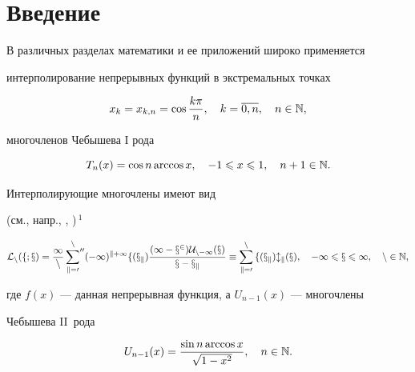 \label{begin}








\section*{Введение}


\setcounter{section}{0}





В различных разделах математики и ее приложений широко применяется 


интерполирование непрерывных функций в экстремальных точках


\begin{equation}


x_k=x_{k,n}=\cos \frac{k \pi}{n}, \quad k=\overline{0,n}, \quad n\in \N,


\end{equation}


многочленов Чебышева I рода


\begin{equation}


T_n(x)=\cos n \arccos x, \quad -1 \lea x \lea 1, \quad n+1 \in \N.


\end{equation}


Интерполирующие многочлены имеют вид


(см., напр., \cite{1}, \cite{16})\,${}^1$


\begin{equation}


\cal L_n(f;x)=\frac{1}{n}\sideset{}{''}\sum_{k=0}^{n}(-1)^{k+1}f(x_k)


\frac {(1-x^2)U_{n-1}(x)}{x-x_k}


\equiv \sum_{k=0}^nf(x_k)l_k(x),


\quad -1 \lea x \lea 1, \quad n \in \N,


\end{equation}


где $f(x)$ --- данная непрерывная функция, а $U_{n-1}(x)$ --- многочлены 


Чебышева II~рода


\begin{equation}


U_{n-1}(x)=\frac{\sin n \arccos x}{\sqrt{1-x^2}}, \quad n \in \N.


\end{equation}





